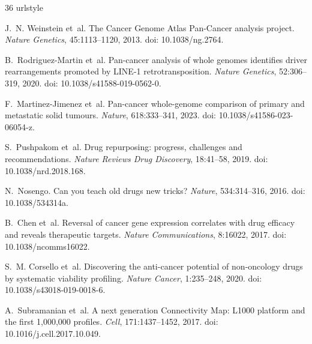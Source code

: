 \FloatBarrier
\begin{thebibliography}{36}
\providecommand{\natexlab}[1]{#1}
\providecommand{\url}[1]{\texttt{#1}}
\expandafter\ifx\csname urlstyle\endcsname\relax
  \providecommand{\doi}[1]{doi: #1}\else
  \providecommand{\doi}{doi: \begingroup \urlstyle{rm}\Url}\fi

J.~N. Weinstein et~al.
\newblock The Cancer Genome Atlas Pan-Cancer analysis project.
\newblock \emph{Nature Genetics}, 45:1113--1120, 2013.
\newblock \doi{10.1038/ng.2764}.

B.~Rodriguez-Martin et~al.
\newblock Pan-cancer analysis of whole genomes identifies driver rearrangements promoted by LINE-1 retrotransposition.
\newblock \emph{Nature Genetics}, 52:306--319, 2020.
\newblock \doi{10.1038/s41588-019-0562-0}.

F.~Martinez-Jimenez et~al.
\newblock Pan-cancer whole-genome comparison of primary and metastatic solid tumours.
\newblock \emph{Nature}, 618:333--341, 2023.
\newblock \doi{10.1038/s41586-023-06054-z}.

S.~Pushpakom et~al.
\newblock Drug repurposing: progress, challenges and recommendations.
\newblock \emph{Nature Reviews Drug Discovery}, 18:41--58, 2019.
\newblock \doi{10.1038/nrd.2018.168}.

N.~Nosengo.
\newblock Can you teach old drugs new tricks?
\newblock \emph{Nature}, 534:314--316, 2016.
\newblock \doi{10.1038/534314a}.

B.~Chen et~al.
\newblock Reversal of cancer gene expression correlates with drug efficacy and reveals therapeutic targets.
\newblock \emph{Nature Communications}, 8:16022, 2017.
\newblock \doi{10.1038/ncomms16022}.

S.~M. Corsello et~al.
\newblock Discovering the anti-cancer potential of non-oncology drugs by systematic viability profiling.
\newblock \emph{Nature Cancer}, 1:235--248, 2020.
\newblock \doi{10.1038/s43018-019-0018-6}.

A.~Subramanian et~al.
\newblock A next generation Connectivity Map: L1000 platform and the first 1,000,000 profiles.
\newblock \emph{Cell}, 171:1437--1452, 2017.
\newblock \doi{10.1016/j.cell.2017.10.049}.


\end{thebibliography}

